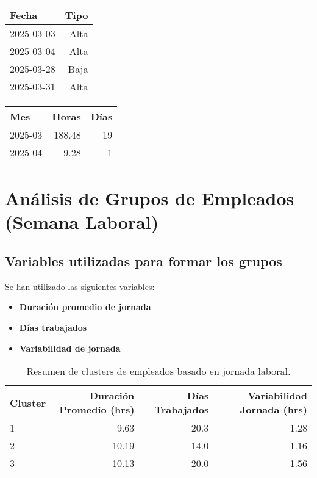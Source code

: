 \documentclass[11pt,a4paper]{article}
\newcommand{\infobox}[2]{
  \begin{tcolorbox}[
    colback=grisclaro,
    colframe=corporativo,
    title=#1,
    fonttitle=\bfseries
  ]
  #2
  \end{tcolorbox}
}
\begin{document}
\hfill
\begin{minipage}[t]{0.35\textwidth}
\infobox{D\'ias At\'ipicos}{
\begin{tabular}{lr}
\toprule
\rowcolor{grisclaro} \textbf{Fecha} & \textbf{Tipo}\\
\midrule

2025-03-03 & Alta\\

2025-03-04 & Alta\\

2025-03-28 & Baja\\

2025-03-31 & Alta\\

\bottomrule
\end{tabular}
}

\vspace{1em}
\infobox{Resumen Mensual}{
\begin{tabular}{lrr}
\toprule
\rowcolor{grisclaro} \textbf{Mes} & \textbf{Horas} & \textbf{D\'ias}\\
\midrule

2025-03 & 188.48 & 19\\

2025-04 & 9.28 & 1\\

\bottomrule
\end{tabular}
}
\end{minipage}

\clearpage


\section{An\'alisis de Grupos de Empleados (Semana Laboral)}

\subsection{Variables utilizadas para formar los grupos}

\infobox{Criterios de agrupaci\'on}{
Se han utilizado las siguientes variables:
\begin{itemize}
  \item \textbf{Duraci\'on promedio de jornada}
  \item \textbf{D\'ias trabajados}
  \item \textbf{Variabilidad de jornada}
\end{itemize}
}

\begin{table}[H]
\centering
\begin{tabular}{lrrr}
\hline
Cluster & Duraci\'on Promedio (hrs) & D\'ias Trabajados & Variabilidad Jornada (hrs) \\ \hline
1 & 9.63 & 20.3 & 1.28 \\
2 & 10.19 & 14.0 & 1.16 \\
3 & 10.13 & 20.0 & 1.56 \\
\hline
\end{tabular}
\caption{Resumen de clusters de empleados basado en jornada laboral.}
\end{table}
\end{document}
